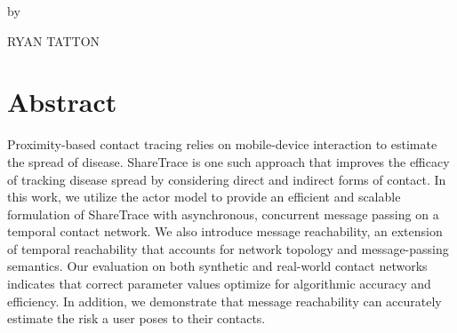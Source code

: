 \begin{center}
\large

\MakeUppercase{\thesisTitle}

\vspace{0.1in}

\vspace{0.1in}

\normalsize

by

\vspace{0.1in}

\large

\MakeUppercase{Ryan Tatton}

\vspace{0.1in}

\normalsize

\end{center}

\section*{Abstract}
Proximity-based contact tracing relies on mobile-device interaction to estimate the spread of disease. ShareTrace is one such approach that improves the efficacy of tracking disease spread by considering direct and indirect forms of contact. In this work, we utilize the actor model to provide an efficient and scalable formulation of ShareTrace with asynchronous, concurrent message passing on a temporal contact network. We also introduce message reachability, an extension of temporal reachability that accounts for network topology and message-passing semantics. Our evaluation on both synthetic and real-world contact networks indicates that correct parameter values optimize for algorithmic accuracy and efficiency. In addition, we demonstrate that message reachability can accurately estimate the risk a user poses to their contacts.
\clearpage